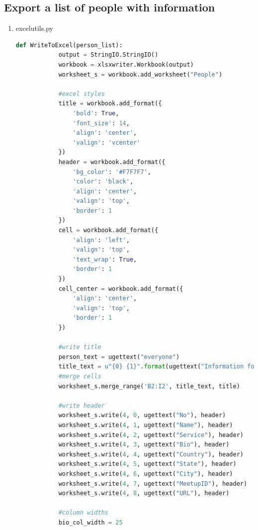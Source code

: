 \documentclass[letterpaper,10pt,onecolumn]{IEEEtran} %
\begin{document}
\subsection{Export a list of people with information}

\begin{enumerate}
  \item excelutils.py
    \begin{center}
      \begin{lstlisting}[language=Python]
        def WriteToExcel(person_list):
            output = StringIO.StringIO()
            workbook = xlsxwriter.Workbook(output)
            worksheet_s = workbook.add_worksheet("People")

            #excel styles
            title = workbook.add_format({
                'bold': True,
                'font_size': 14,
                'align': 'center',
                'valign': 'vcenter'
            })
            header = workbook.add_format({
                'bg_color': '#F7F7F7',
                'color': 'black',
                'align': 'center',
                'valign': 'top',
                'border': 1
            })
            cell = workbook.add_format({
                'align': 'left',
                'valign': 'top',
                'text_wrap': True,
                'border': 1
            })
            cell_center = workbook.add_format({
                'align': 'center',
                'valign': 'top',
                'border': 1
            })

            #write title
            person_text = ugettext("everyone")
            title_text = u"{0} {1}".format(ugettext("Information for"), person_text)
            #merge cells
            worksheet_s.merge_range('B2:I2', title_text, title)

            #write header
            worksheet_s.write(4, 0, ugettext("No"), header)
            worksheet_s.write(4, 1, ugettext("Name"), header)
            worksheet_s.write(4, 2, ugettext("Service"), header)
            worksheet_s.write(4, 3, ugettext("Bio"), header)
            worksheet_s.write(4, 4, ugettext("Country"), header)
            worksheet_s.write(4, 5, ugettext("State"), header)
            worksheet_s.write(4, 6, ugettext("City"), header)
            worksheet_s.write(4, 7, ugettext("MeetupID"), header)
            worksheet_s.write(4, 8, ugettext("URL"), header)

            #column widths
            bio_col_width = 25


\end{lstlisting}
\end{center}
\end{enumerate}
\end{document}
